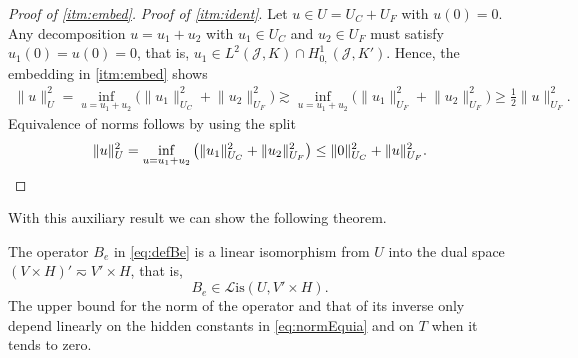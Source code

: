 \documentclass{amsart}
\newcommand{\cJ}{\mathcal J}
\newcommand{\cL}{\mathcal L}
\newcommand{\Lis}{\cL\mathrm{is}}
\begin{document}
\begin{proof}[Proof of \ref{itm:embed}]
\textit{Proof of \ref{itm:ident}}.
Let $u\in U = U_C + U_F$ with $u(0) = 0$. Any decomposition $u = u_1 + u_2$ with $u_1 \in U_C$ and $u_2 \in U_F$ must satisfy $u_1(0) = u(0) = 0$, that is, $u_1 \in L^2(\cJ,K) \cap H^1_{0,}(\cJ,K')$. Hence, the embedding in \ref{itm:embed} shows 
\begin{align*}
\lVert u \rVert_U^2 = \inf_{u = u_1 + u_2} \big( \lVert u_1 \rVert_{U_C}^2 + \lVert u_2 \rVert_{U_F}^2 \big) \gtrsim \inf_{u = u_1 + u_2} \big( \lVert u_1 \rVert_{U_F}^2 + \lVert u_2 \rVert_{U_F}^2 \big) \geq \tfrac12 \lVert u \rVert_{U_F}^2. 
\end{align*} 
Equivalence of norms follows by using the split
\begin{equation*}
\lVert u \rVert_U^2 = \inf_{u = u_1 + u_2} \big(\lVert u_1 \rVert_{U_C}^2 + \lVert u_2 \rVert_{U_F}^2\big) \leq \lVert 0 \rVert_{U_C}^2 + \lVert u \rVert_{U_F}^2.\qedhere
\end{equation*}
\end{proof}
With this auxiliary result we can show the following theorem.
\begin{theorem}\label{thm:well-posedness}
The operator $B_e$ in \eqref{eq:defBe} is a linear isomorphism from $U  $ into the dual space $(V \times H)' \eqsim V' \times H$, that is, 
\begin{equation*}
B_e \in \Lis(U ,V ' \times H).
\end{equation*}
The upper bound for the norm of the operator and that of its inverse only depend linearly on the hidden constants in \eqref{eq:normEquia} and on $T$ when it tends to zero.
\end{theorem}
\end{document}
